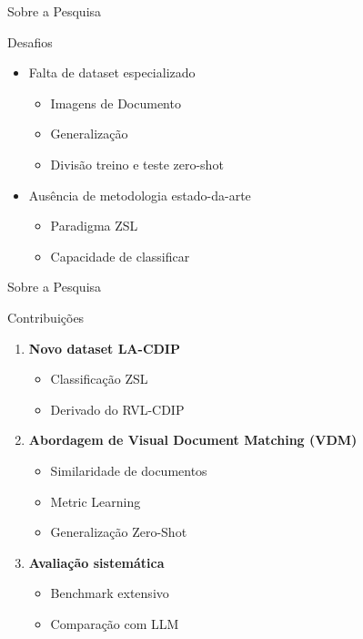 \begin{frame}{Sobre a Pesquisa}
\begin{block}{Desafios}
    
    \begin{itemize}
        \item {\large Falta de dataset especializado}
        \begin{itemize}
            \item Imagens de Documento
            \item Generalização
            \item Divisão treino e teste zero-shot
        \end{itemize}
        \item {\large Ausência de metodologia estado-da-arte}
        \begin{itemize}
            \item Paradigma ZSL
            \item Capacidade de classificar
        \end{itemize}
    \end{itemize}
    
\end{block}
\end{frame}

\begin{frame}{Sobre a Pesquisa}
\begin{block}{Contribuições}
    \begin{enumerate}
        \item \textbf{Novo dataset LA-CDIP}
        \begin{itemize}
            \item Classificação ZSL
            \item Derivado do RVL-CDIP
        \end{itemize}
        
        \item \textbf{Abordagem de Visual Document Matching (VDM)}
        \begin{itemize}
            \item Similaridade de documentos
            \item Metric Learning
            \item Generalização Zero-Shot
        \end{itemize}
        
        \item \textbf{Avaliação sistemática}
        \begin{itemize}
            \item Benchmark extensivo
            \item Comparação com LLM
        \end{itemize}
    \end{enumerate}
\end{block}
\end{frame}
